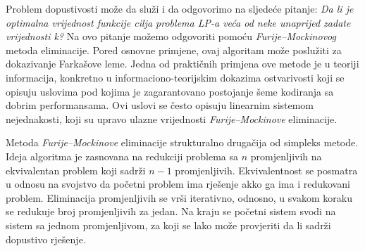 \documentclass[b5paper, utf8, 11pt, colorlinks]{book}
\theoremstyle{definition}
\begin{document}
Problem dopustivosti može da služi i da odgovorimo na sljedeće pitanje: 
\emph{Da li je optimalna vrijednost funkcije cilja problema LP-a veća od neke unaprijed zadate  vrijednosti k?}
Na ovo pitanje možemo odgovoriti pomoću  \emph{Furije–Mockinovog} metoda eliminacije. Pored osnovne primjene, ovaj algoritam može poslužiti za dokazivanje Farkašove leme. Jedna od praktičnih primjena  ove metode je u teoriji informacija, konkretno u informaciono-teorijskim dokazima ostvarivosti koji se opisuju uslovima pod kojima je zagarantovano postojanje šeme kodiranja sa dobrim performansama. Ovi uslovi se često opisuju linearnim sistemom nejednakosti, koji su upravo ulazne vrijednosti  \emph{Furije–Mockinove} eliminacije. 

Metoda  \emph{Furije–Mockinove} eliminacije strukturalno drugačija  od simpleks metode. Ideja algoritma je zasnovana na redukciji problema sa $n$ promjenljivih na ekvivalentan problem koji sadrži $n-1$ promjenljivih. Ekvivalentnost se posmatra u odnosu na svojstvo da početni problem ima rješenje akko ga ima i redukovani problem. Eliminacija promjenljivih se vrši iterativno, odnosno, u svakom koraku se redukuje broj promjenljivih za jedan. Na kraju se početni sistem svodi na sistem sa jednom promjenljivom, za koji se lako može provjeriti da li sadrži dopustivo rješenje.
\end{document}
